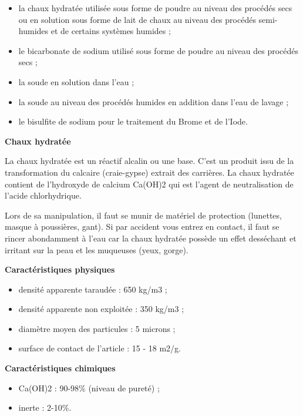 \begin{itemize}

\item la chaux hydratée utilisée sous forme de poudre au niveau des procédés secs ou en solution sous forme de lait de chaux au niveau des procédés semi-humides et de certains systèmes humides ;
\item  le bicarbonate de sodium utilisé sous forme de poudre au niveau des procédés secs ;
\item  la soude en solution dans l’eau ;
\item  la soude au niveau des procédés humides en addition dans l’eau de lavage ;
\item  le bisulfite de sodium pour le traitement du Brome et de l’Iode.

   
\end{itemize}




\vspace{0.3cm}
\textbf{Chaux hydratée}
\vspace{0.3cm}

La chaux hydratée est un réactif alcalin ou une base. C’est un produit issu de la transformation du calcaire (craie-gypse) extrait des carrières. La chaux hydratée contient de l’hydroxyde de calcium Ca(OH)2 qui est l’agent de neutralisation de l’acide chlorhydrique.

\vspace{0.3cm}

Lors de sa manipulation, il faut se munir de matériel de protection (lunettes, masque à poussières, gant). Si par accident vous entrez en contact, il faut se rincer abondamment à l’eau car la chaux hydratée possède un effet desséchant et irritant sur la peau et les muqueuses (yeux, gorge).


\vspace{0.3cm}
\textbf{Caractéristiques physiques}
\begin{itemize}
  
  \item densité apparente taraudée : 650 kg/m3 ;
  \item densité apparente non exploitée : 350 kg/m3 ;
  \item diamètre moyen des particules : 5 microns ;
  \item surface de contact de l'article : 15 - 18 m2/g.
 
\end{itemize}

\vspace{0.3cm}
\textbf{Caractéristiques chimiques}
\begin{itemize}
  \item Ca(OH)2 : 90-98\% (niveau de pureté) ;
  \item inerte : 2-10\%.
\end{itemize}

